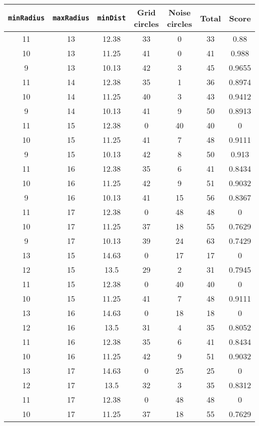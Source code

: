 \documentclass[letterpaper, 12pt]{article}
\begin{document}
\begin{longtable}{|c|c|c|c|c|c|c|}
\hline
\textbf{\texttt{minRadius}} & \textbf{\texttt{maxRadius}} & \textbf{\texttt{minDist}} & \textbf{Grid circles} & \textbf{Noise circles} & \textbf{Total} & \textbf{Score} \\
\hline
11 & 13 & 12.38 & 33 & 0 & 33 & 0.88 \\
\hline
10 & 13 & 11.25 & 41 & 0 & 41 & 0.988 \\
\hline
9 & 13 & 10.13 & 42 & 3 & 45 & 0.9655 \\
\hline
11 & 14 & 12.38 & 35 & 1 & 36 & 0.8974 \\
\hline
10 & 14 & 11.25 & 40 & 3 & 43 & 0.9412 \\
\hline
9 & 14 & 10.13 & 41 & 9 & 50 & 0.8913 \\
\hline
11 & 15 & 12.38 & 0 & 40 & 40 & 0 \\
\hline
10 & 15 & 11.25 & 41 & 7 & 48 & 0.9111 \\
\hline
9 & 15 & 10.13 & 42 & 8 & 50 & 0.913 \\
\hline
11 & 16 & 12.38 & 35 & 6 & 41 & 0.8434 \\
\hline
10 & 16 & 11.25 & 42 & 9 & 51 & 0.9032 \\
\hline
9 & 16 & 10.13 & 41 & 15 & 56 & 0.8367 \\
\hline
11 & 17 & 12.38 & 0 & 48 & 48 & 0 \\
\hline
10 & 17 & 11.25 & 37 & 18 & 55 & 0.7629 \\
\hline
9 & 17 & 10.13 & 39 & 24 & 63 & 0.7429 \\
\hline
13 & 15 & 14.63 & 0 & 17 & 17 & 0 \\
\hline
12 & 15 & 13.5 & 29 & 2 & 31 & 0.7945 \\
\hline
11 & 15 & 12.38 & 0 & 40 & 40 & 0 \\
\hline
10 & 15 & 11.25 & 41 & 7 & 48 & 0.9111 \\
\hline
13 & 16 & 14.63 & 0 & 18 & 18 & 0 \\
\hline
12 & 16 & 13.5 & 31 & 4 & 35 & 0.8052 \\
\hline
11 & 16 & 12.38 & 35 & 6 & 41 & 0.8434 \\
\hline
10 & 16 & 11.25 & 42 & 9 & 51 & 0.9032 \\
\hline
13 & 17 & 14.63 & 0 & 25 & 25 & 0 \\
\hline
12 & 17 & 13.5 & 32 & 3 & 35 & 0.8312 \\
\hline
11 & 17 & 12.38 & 0 & 48 & 48 & 0 \\
\hline
10 & 17 & 11.25 & 37 & 18 & 55 & 0.7629 \\

\end{longtable}
\end{document}
